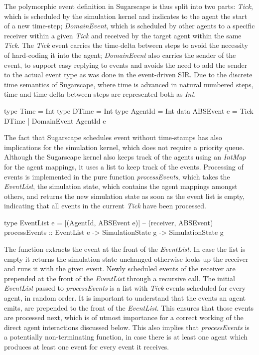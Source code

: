 The polymorphic event definition in Sugarscape is thus split into two parts: \textit{Tick}, which is scheduled by the simulation kernel and indicates to the agent the start of a new time-step; \textit{DomainEvent}, which is scheduled by other agents to a specific receiver within a given \textit{Tick} and received by the target agent within the same \textit{Tick}. The \textit{Tick} event carries the time-delta between steps to avoid the necessity of hard-coding it into the agent; \textit{DomainEvent} also carries the sender of the event, to support easy replying to events and avoids the need to add the sender to the actual event type as was done in the event-driven SIR. Due to the discrete time semantics of Sugarscape, where time is advanced in natural numbered steps, time and time-delta between steps are represented both as \textit{Int}.

\begin{HaskellCode}
type Time       = Int
type DTime      = Int
type AgentId    = Int
data ABSEvent e = Tick DTime 
                | DomainEvent AgentId e
\end{HaskellCode}

The fact that Sugarscape schedules event without time-stamps has also implications for the simulation kernel, which does not require a priority queue. Although the Sugarscape kernel also keeps track of the agents using an \textit{IntMap} for the agent mappings, it uses a list to keep track of the events. Processing of events is implemented in the pure function \textit{processEvents}, which takes the \textit{EventList}, the simulation state, which contains the agent mappings amongst others, and returns the new simulation state as soon as the event list is empty, indicating that all events in the current \textit{Tick} have been processed.

\begin{HaskellCode}
type EventList e = [(AgentId, ABSEvent e)] -- (receiver, ABSEvent)
processEvents :: EventList e -> SimulationState g -> SimulationState g
\end{HaskellCode}

The function extracts the event at the front of the \textit{EventList}. In case the list is empty it returns the simulation state unchanged otherwise looks up the receiver and runs it with the given event. Newly scheduled events of the receiver are prepended at the front of the \textit{EventList} through a recursive call. The initial \textit{EventList} passed to \textit{processEvents} is a list with \textit{Tick} events scheduled for every agent, in random order. It is important to understand that the events an agent emits, are prepended to the front of the \textit{EventList}. This ensures that those events are processed next, which is of utmost importance for a correct working of the direct agent interactions discussed below. This also implies that \textit{processEvents} is a potentially non-terminating function, in case there is at least one agent which produces at least one event for every event it receives.

